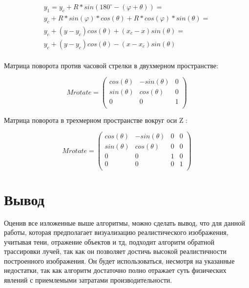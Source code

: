 \begin{multline}
\\
y_1 = y_c + R*sin(180^{\circ}-(\varphi +  \theta)) = \\
y_c + R*sin(\varphi)*cos(\theta) + R*cos(\varphi)*sin(\theta) = \\ 
y_c + (y - y_c)cos(\theta) + (x_c- x)sin(\theta) = \\ 
y_c + (y - y_c)cos(\theta) - (x - x_c)sin(\theta) \\
\end{multline}

Матрица поворота против часовой стрелки в двухмерном пространстве:

\begin{equation}
Mrotate = \left(
\begin{array}{cccc}
cos(\theta) & -sin(\theta) & 0 \\
sin(\theta) & cos(\theta) & 0 \\
0 & 0 & 1 \\
\end{array}
\right)
\end{equation}

Матрица поворота в трехмерном пространстве вокруг оси Z :

\begin{equation}
Mrotate = \left(
\begin{array}{cccc}
cos(\theta) & -sin(\theta) & 0 & 0 \\
sin(\theta) & cos(\theta) & 0 & 0 \\
0 & 0 & 1 & 0 \\
0 & 0 & 0 & 1 \\
\end{array}
\right)
\end{equation}

\section {Вывод}

Оценив все изложенные выше алгоритмы, можно сделать вывод, что для данной работы, которая предполагает визуализацию реалистического изображения, учитывая тени, отражение объектов и тд, подходит алгоритм обратной трассировки лучей, так как он позволяет достичь высокой реалистичности построенного изображения. Он будет использоваться, несмотря на указанные недостатки, так как алгоритм достаточно полно отражает суть физических явлений с приемлемыми затратами производительности.

